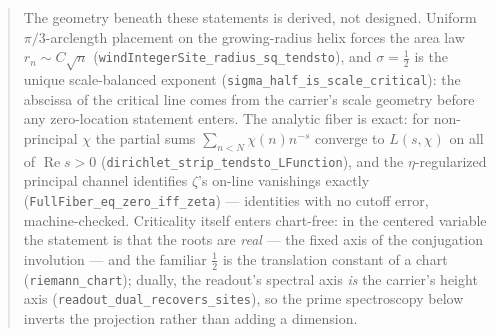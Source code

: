\documentclass[11pt]{article}
\DeclareMathOperator{\Ree}{Re}
\newcommand{\code}[1]{\texttt{#1}}
\begin{document}
\begin{abstract}
The geometry beneath these statements is derived, not designed.  Uniform $\pi/3$-arclength placement
on the growing-radius helix forces the area law $r_n\sim C\sqrt n$
(\code{windIntegerSite\_radius\_sq\_tendsto}), and $\sigma=\tfrac12$ is the unique scale-balanced
exponent (\code{sigma\_half\_is\_scale\_critical}): the abscissa of the critical line comes from the
carrier's scale geometry before any zero-location statement enters.  The analytic fiber is exact:
for non-principal $\chi$ the partial sums $\sum_{n<N}\chi(n)n^{-s}$ converge to $L(s,\chi)$ on all
of $\Ree s>0$ (\code{dirichlet\_strip\_tendsto\_LFunction}), and the $\eta$-regularized principal
channel identifies $\zeta$'s on-line vanishings exactly (\code{FullFiber\_eq\_zero\_iff\_zeta}) ---
identities with no cutoff error, machine-checked.  Criticality itself enters chart-free:
in the centered variable the statement is that the roots are \emph{real} --- the fixed axis of the
conjugation involution --- and the familiar $\tfrac12$ is the translation constant of a chart
(\code{riemann\_chart}); dually, the readout's spectral axis \emph{is} the carrier's height axis
(\code{readout\_dual\_recovers\_sites}), so the prime spectroscopy below inverts the projection
rather than adding a dimension.


\end{abstract}
\end{document}

